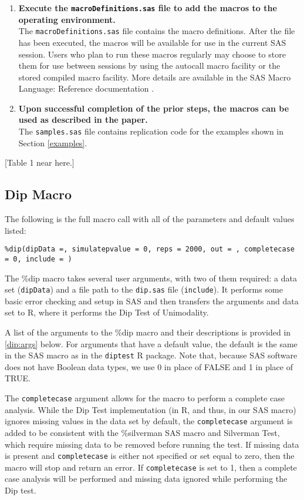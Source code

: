 \documentclass[]{interact}
\theoremstyle{plain}%
\theoremstyle{definition}
\theoremstyle{remark}
\begin{document}
\begin{enumerate}
\item \textbf{Execute the \texttt{macroDefinitions.sas} file to add the macros to the operating environment.} \\
The \texttt{macroDefinitions.sas} file contains the macro definitions. After the file has been executed, the macros will be available for use in the current SAS session. Users who plan to run these macros regularly may choose to store them for use between sessions by using the autocall macro facility or the stored compiled macro facility. More details are available in the SAS Macro Language: Reference documentation \citep[p.~113]{SAS-macroref}.

\item \textbf{Upon successful completion of the prior steps, the macros can be used as described in the paper.} \\
The \texttt{samples.sas} file contains replication code for the examples shown in Section \ref{examples}.

\end{enumerate}

[Table 1 near here.]

\subsection{Dip Macro}
\label{subsec:dip}
The following is the full macro call with all of the parameters and default values listed:

\texttt{\%dip(dipData =, simulatepvalue = 0, reps = 2000, out = , completecase = 0, include = )}

The \%dip macro takes several user arguments, with two of them required: a data set (\texttt{dipData}) and a file path to the \texttt{dip.sas} file (\texttt{include}). It performs some basic error checking and setup in SAS and then transfers the arguments and data set to R, where it performs the Dip Test of Unimodality. 

A list of the arguments to the \%dip macro and their descriptions is provided in \ref{dip:args} below. For arguments that have a default value, the default is the same in the SAS macro as in the \texttt{diptest} R package. Note that, because SAS software does not have Boolean data types, we use 0 in place of FALSE and 1 in place of TRUE.

The \texttt{completecase} argument allows for the macro to perform a complete case analysis. While the Dip Test implementation (in R, and thus, in our SAS macro) ignores missing values in the data set by default, the \texttt{completecase} argument is added to be consistent with the \%silverman SAS macro and Silverman Test, which require missing data to be removed before running the test. If missing data is present and \texttt{completecase} is either not specified or set equal to zero, then the macro will stop and return an error. If \texttt{completecase} is set to 1, then a complete case analysis will be performed and missing data ignored while performing the Dip test.
\end{document}
